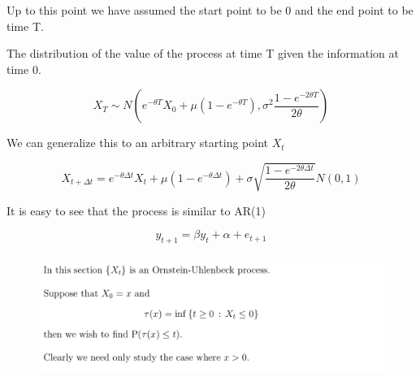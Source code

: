 \documentclass[c, dvipsnames, 8pt]{beamer}
\begin{document}
\begin{frame}[shrink=5]

Up to this point we have assumed the start point to be 0 and the end point to be time T. 

The distribution of the value of the process at time T given the information at time 0.

\begin{equation}\label{key}
X_T \sim N(e^{-\theta T} X_0   +  \mu (1-e^{-\theta T} ),  \sigma^2 \dfrac{1 - e^{-2\theta T}}{2\theta} )
\end{equation}
	
We can generalize this to an arbitrary starting point $X_t$


\begin{equation}\label{key}
X_{t+\Delta t } = e^{-\theta \Delta t} X_t   +  \mu (1-e^{-\theta \Delta t} )
 + \sigma \sqrt{\dfrac{1- e^{-2\theta \Delta t}}{2\theta}} N(0,1)
 \end{equation}	

	
It is easy to see that the process is similar to 	AR(1)
	
\begin{equation}\label{key}
y_{t+1} = \beta y_{t} + \alpha + e_{t+1}
\end{equation}	
	
\end{frame}









\begin{frame}[shrink=5]
	
	
	\frametitle{\insertsection} 
	\begin{figure}
		\centering
		\includegraphics[width=1\linewidth]{screenshot012}
		\label{fig:screenshot001}
	\end{figure}
	

	
\end{frame}
\end{document}
